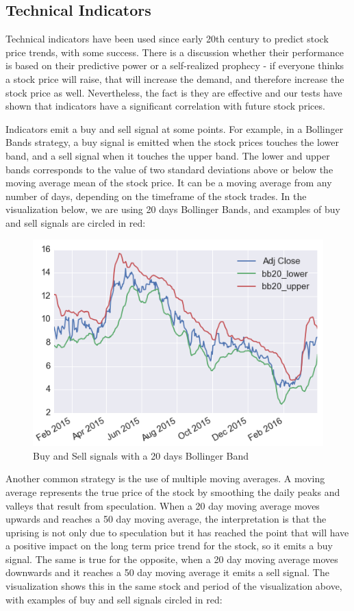 \documentclass[prodmode,acmtecs]{acmsmall} %
\begin{document}
\subsection {Technical Indicators}

Technical indicators have been used since early 20th century to predict stock price trends, with some success. There is a discussion whether their performance is based on their predictive power or a self-realized prophecy - if everyone thinks a stock price will raise, that will increase the demand, and therefore increase the stock price as well. Nevertheless, the fact is they are effective and our tests have shown that indicators have a significant correlation with future stock prices.

Indicators emit a buy and sell signal at some points. For example, in a Bollinger Bands strategy, a buy signal is emitted when the stock prices touches the lower band, and a sell signal when it touches the upper band. The lower and upper bands corresponds to the value of two standard deviations above or below the moving average mean of the stock price. It can be a moving average from any number of days, depending on the timeframe of the stock trades. In the visualization below, we are using 20 days Bollinger Bands, and examples of buy and sell signals are circled in red:

\begin{figure}
	\centering
	\includegraphics[scale=.5]{bbfig}
	\caption{Buy and Sell signals with a 20 days Bollinger Band}
	\label{fig:two}
\end{figure}

Another common strategy is the use of multiple moving averages. A moving average represents the true price of the stock by smoothing the daily peaks and valleys that result from speculation. When a 20 day moving average moves upwards and reaches a 50 day moving average, the interpretation is that the uprising is not only due to speculation but it has reached the point that will have a positive impact on the long term price trend for the stock, so it emits a buy signal. The same is true for the opposite, when a 20 day moving average moves downwards and it reaches a 50 day moving average it emits a sell signal. The visualization shows this in the same stock and period of the visualization above, with examples of buy and sell signals circled in red:
\end{document}
